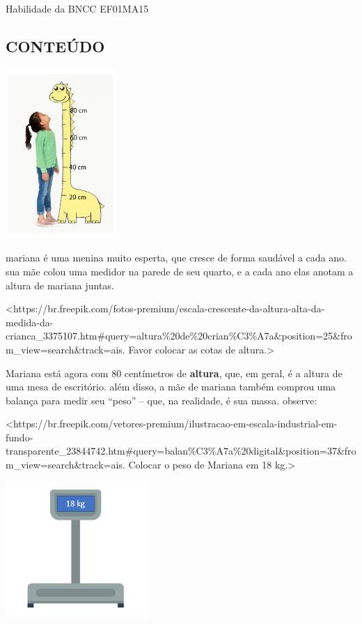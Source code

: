 Habilidade da BNCC
EF01MA15

\subsection{CONTEÚDO}\label{conteuxfado-2}

\includegraphics[width=1.67708in,height=2.53098in]{media/image21.png}

mariana é uma menina muito esperta, que cresce de forma saudável a cada
ano. sua mãe colou uma medidor na parede de seu quarto, e a cada ano
elas anotam a altura de mariana juntas.

\textless{}https://br.freepik.com/fotos-premium/escala-crescente-da-altura-alta-da-medida-da-crianca\_3375107.htm\#query=altura\%20de\%20crian\%C3\%A7a\&position=25\&from\_view=search\&track=ais.
Favor colocar as cotas de altura.\textgreater{}

Mariana está agora com 80 centímetros de \textbf{altura}, que, em geral, é a altura de uma mesa de escritório.
além disso, a mãe de mariana também comprou uma balança para medir seu
``peso'' -- que, na realidade, é sua massa. observe:

\textless{}https://br.freepik.com/vetores-premium/ilustracao-em-escala-industrial-em-fundo-transparente\_23844742.htm\#query=balan\%C3\%A7a\%20digital\&position=37\&from\_view=search\&track=ais.
Colocar o peso de Mariana em 18 kg.\textgreater{}

\includegraphics[width=2.13542in,height=2.04324in]{media/image22.png}

